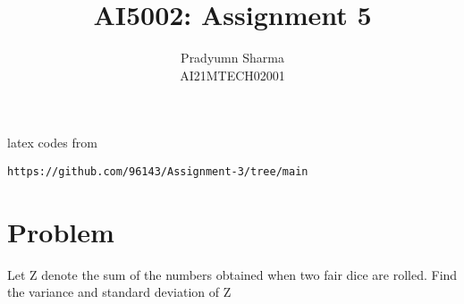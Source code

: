 \documentclass[journal,12pt,twocolumn]{IEEEtran}
\begin{document}
\let\vec\mathbf
\renewcommand{\thefigure}{\theproblem}
\def\putbox#1#2#3{\makebox[0in][l]{\makebox[#1][l]{}\raisebox{\baselineskip}[0in][0in]{\raisebox{#2}[0in][0in]{#3}}}}
     \def\rightbox#1{\makebox[0in][r]{#1}}
     \def\centbox#1{\makebox[0in]{#1}}
     \def\topbox#1{\raisebox{-\baselineskip}[0in][0in]{#1}}
     \def\midbox#1{\raisebox{-0.5\baselineskip}[0in][0in]{#1}}
\vspace{3cm}
\title{AI5002: Assignment 5}
\author{Pradyumn Sharma\\ AI21MTECH02001}
\maketitle
\newpage
\bigskip
\renewcommand{\thefigure}{\theenumi}
\renewcommand{\thetable}{\theenumi}
%
latex codes from 
%
\begin{lstlisting}
https://github.com/96143/Assignment-3/tree/main
\end{lstlisting}
\section{Problem}
Let Z denote the sum of the numbers obtained
when two fair dice are rolled. Find the
variance and standard deviation of Z
\end{document}

